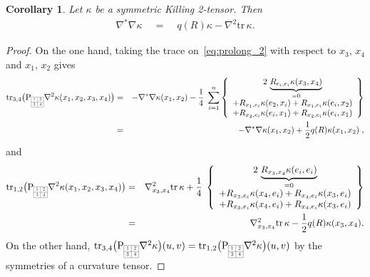 \documentclass[11pt,a4paper]{article}
\theoremstyle{plain}
\newtheorem{corollary}{Corollary}
\theoremstyle{remark}
\newcommand{\trace}{\mathrm{tr}}
\newcommand{\rmP}{\mathrm{P}}
\begin{document}
\bigskip
\begin{corollary}
Let $\kappa$ be a symmetric Killing 2-tensor. Then \begin{eqnarray}\label{eq:Wb}
 \nabla^*\nabla \kappa &\;\;=\;\;& q(R)\kappa - \nabla^2\trace \, \kappa .
\end{eqnarray}
\end{corollary}
\begin{proof}
On the one hand, taking the trace on~\eqref{eq:prolong_2} with respect to $x_3,\, x_4$ and  $x_1,\, x_2$ gives
\begin{eqnarray*}
\trace_{3,4} \big (\rmP_{\scaleto{\begin{array}{|c|c|}
\cline{1-2}
1 & 2 \\
\cline{1-2}
3  & 4 \\
\cline{1-2} 
\end{array}}{12pt}} \nabla^2\kappa (x_1,x_2,x_3,x_4)\big ) &=& - \nabla^*\nabla \kappa(x_1,x_2) - \frac{1}{4}\;\sum_{i=1}^n 
\left \lbrace\begin{array}{c} 
2\, \underbrace{R_{e_i,e_i}\kappa(x_3,x_4)}_{=0}\\
+ R_{x_1,e_i}\kappa(e_2,x_i) + R_{x_1,e_i}\kappa(e_i,x_2)\\ +  R_{x_2,e_i}\kappa(e_i,x_1) + R_{x_2,e_i}\kappa(e_i,x_1)  \end{array} \right \rbrace\\
&=&  - \nabla^*\nabla \kappa(x_1,x_2) + \frac{1}{2} q(R)\kappa(x_1,x_2)\;,
\end{eqnarray*}
and
\begin{eqnarray*}
\trace_{1,2} \big (\rmP_{\scaleto{\begin{array}{|c|c|}
\cline{1-2}
1 & 2 \\
\cline{1-2}
3  & 4 \\
\cline{1-2} 
\end{array}}{12pt}}\nabla^2\kappa (x_1,x_2,x_3,x_4)\big ) &=& \nabla^2_{x_3,x_4 }\trace \, \kappa
+ \frac{1}{4}\;\left \lbrace\begin{array}{c} 
2\, \underbrace{R_{x_3,x_4}\kappa(e_i,e_i)}_{=0}\\
+ R_{x_3,e_i}\kappa(x_4,e_i) + R_{x_4,e_i}\kappa(x_3,e_i)\\  + R_{x_3,e_i}\kappa(x_4,e_i) +
           R_{x_4,e_i}\kappa(x_3,e_i)\end{array} \right \rbrace\\
&=& \nabla^2_{x_3,x_4 }\trace \, \kappa - \frac{1}{2} q(R)\kappa(x_3,x_4).
\end{eqnarray*}
On the other hand, $\trace_{3,4} \big ( \rmP_{\scaleto{\begin{array}{|c|c|}
\cline{1-2}
1 & 2 \\
\cline{1-2}
3  & 4 \\
\cline{1-2} 
\end{array}}{12pt}}\nabla^2\kappa \big )(u,v) = \trace_{1,2} \big ( \rmP_{\scaleto{\begin{array}{|c|c|}
\cline{1-2}
1 & 2 \\
\cline{1-2}
3  & 4 \\
\cline{1-2} 
\end{array}}{12pt}}\nabla^2\kappa \big )(u,v)$ by the symmetries of a curvature tensor.
\end{proof}
\end{document}
